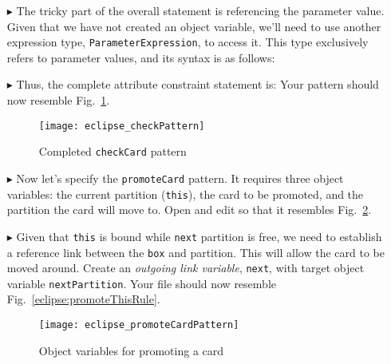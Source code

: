 \begin{itemize}
\item[$\blacktriangleright$] The tricky part of the overall statement is referencing the parameter value. Given that we have not created an object variable,
we'll need to use another expression type, \texttt{ParameterExpression}, to access it. This type exclusively refers to parameter
values, and its syntax is as follows:

\item[$\blacktriangleright$] Thus, the complete attribute constraint statement is:  Your pattern should now resemble
Fig.~\ref{eclipse:checkPattern}.

\vspace{0.5cm}

\begin{figure}[htbp]
\begin{center}
  \texttt{[image: eclipse\_checkPattern]}
  \caption{Completed \texttt{checkCard} pattern}
  \label{eclipse:checkPattern}
\end{center}
\end{figure} 

\item[$\blacktriangleright$] Now let's specify the \texttt{promoteCard} pattern. It requires three object variables: the current partition (\texttt{this}),
the card to be promoted, and the partition the card will move to. Open and edit so that it resembles Fig.~\ref{eclipse:promoteCardPattern}.

\item[$\blacktriangleright$] Given that \texttt{this} is bound while \texttt{next} partition is free, we need to establish a reference link between the
\texttt{box} and partition. This will allow the card to be moved around. Create an \emph{outgoing link variable}, \texttt{next},  with target object variable
\texttt{nextPartition}. Your file should now resemble Fig.~\ref{eclipse:promoteThisRule}.

\begin{figure}[htbp]
\begin{center}
  \texttt{[image: eclipse\_promoteCardPattern]}
  \caption{Object variables for promoting a card}
  \label{eclipse:promoteCardPattern}
\end{center}
\end{figure} 


\end{itemize}
